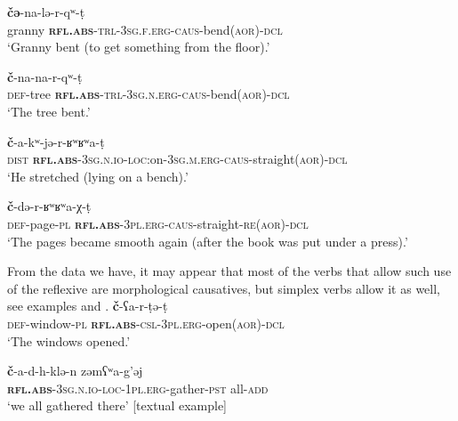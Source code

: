 \documentclass[output=paper]{langscibook}
\begin{document}
\ea
\label{ex:Arkadiev:53}
    \ea 
    \label{ex:Arkadiev:53a}
      \textbf{{č{ə}}}{{}-na-l{ə}-r-q{ʷ}-t{̣}}\\
      granny  \textbf{\textsc{rfl.abs}}\textsc{{}-trl-3sg.f.erg-caus}{}-bend(\textsc{aor)-dcl}\\
    \glt  ‘Granny bent (to get something from the floor).’ 
    
    \ex 
    \label{ex:Arkadiev:53b}
     \textbf{{č}}{{}-na-na-r-q{ʷ}-t{̣}}\\
    \textsc{def}{}-tree  \textbf{\textsc{rfl.abs}}\textsc{{}-trl-3sg.n.erg-caus}{}-bend(\textsc{aor)-dcl}\\
    \glt  ‘The tree bent.’ 
\z
\z

\ea
\label{ex:Arkadiev:54}
    \ea 
    \label{ex:Arkadiev:54a}
     \textbf{{č}}{{}-a-k{ʷ}-j{ə}-r-{ʁ}{ʷ}{ʁ}{ʷ}a-t{̣}}\\
     \textsc{dist}  \textbf{\textsc{rfl.abs}}\textsc{{}-3sg.n.io-loc:}on\textsc{{}-3sg.m.erg-caus}{}-straight(\textsc{aor})-\textsc{dcl}\\
    \glt ‘He stretched (lying on a bench).’
    
    \ex 
    \label{ex:Arkadiev:54b}
     \textbf{{č}}{{}-d{ə}-r-{ʁ}{ʷ}{ʁ}{ʷ}a-χ-t{̣}}\\
    \textsc{def}{}-page-\textsc{pl}  \textbf{\textsc{rfl.abs}}\textsc{{}-3pl.erg-caus}{}-straight-\textsc{re(aor)-dcl}\\
    \glt ‘The pages became smooth again (after the book was put under a press).’
\z
\z    

From the data we have, it may appear that most of the verbs that allow such use of the reflexive are morphological causatives, but simplex verbs allow it as well, see examples  and .
\ea 
    \label{ex:Arkadiev:55}
     \textbf{{č}}{{}-{ʕ}a-r-t{̣}{ə}-t{̣}}\\
   \textsc{def}{}-window\textsc{{}-pl} \textbf{\textsc{rfl.abs}}\textsc{{}-csl-3pl.erg}{}-open\textsc{(aor)-dcl}\\
    \glt ‘The windows opened.’ \citep[362]{Tugov1967}
\z

\ea 
    \label{ex:Arkadiev:56}
    \gll \textbf{č}-a-d-h-klə-n  z{ə}m{ʕ}{ʷ}a-g’{ə}j\\
   \textbf{\textsc{rfl.abs}}\textsc{{}-3sg.n.io-loc-1pl.erg}{}-gather-\textsc{pst}  all-\textsc{add}\\
    \glt ‘we all gathered there’ [textual example]
\z
 
\end{document}
